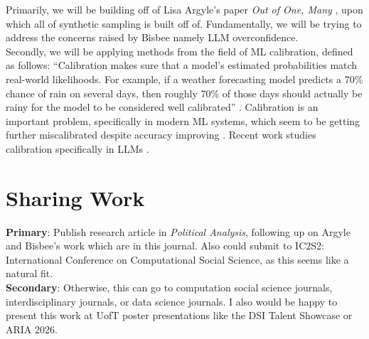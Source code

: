 \documentclass{scrartcl}
\begin{document}
Primarily, we will be building off of Lisa Argyle's paper \textit{Out of One, Many} \cite{Argyle}, upon which all of synthetic sampling is built off of. Fundamentally, we will be trying to address the concerns raised by Bisbee \cite{Bisbee} namely LLM overconfidence.\\

Secondly, we will be applying methods from the field of ML calibration, defined as follows: ``Calibration makes sure that a model’s estimated probabilities match real-world likelihoods. For example, if a weather forecasting model predicts a 70\% chance of rain on several days, then roughly 70\% of those days should actually be rainy for the model to be considered well calibrated'' \cite{calibration}. Calibration is an important problem, specifically in modern ML systems, which seem to be getting further miscalibrated despite accuracy improving \cite{guo}. Recent work studies calibration specifically in LLMs \cite{shen}.

\section{Sharing Work}
\textbf{Primary}: Publish research article in \textit{Political Analysis}, following up on Argyle and Bisbee's work which are in this journal. Also could submit to IC2S2: International Conference on Computational Social Science, as this seems like a natural fit.\\
\textbf{Secondary}: Otherwise, this can go to computation social science journals, interdisciplinary journals, or data science journals. I also would be happy to present this work at UofT poster presentations like the DSI Talent Showcase or ARIA 2026.
\end{document}
